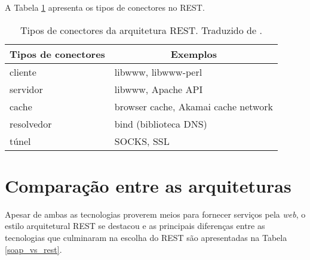     A Tabela \ref{rest-connectors-elements} apresenta os tipos de conectores no REST.
    
    \begin{table}[ht!]
    \centering
    \caption{Tipos de conectores da arquitetura REST. Traduzido de \cite{fielding2002}.}
    \label{rest-connectors-elements}
    \begin{tabular}{l|l}
    \hline
    \multicolumn{1}{c|}{\textbf{Tipos de conectores}} & \multicolumn{1}{c}{\textbf{Exemplos}} \\ \hline
    cliente                                            & libwww, libwww-perl                    \\ \hline
    servidor                                           & libwww, Apache API                     \\ \hline
    cache                                              & browser cache, Akamai cache network    \\ \hline
    resolvedor                                         & bind (biblioteca DNS)                  \\ \hline
    túnel                                              & SOCKS, SSL                             \\ \hline
    \end{tabular}
    \end{table}

\section{Comparação entre as arquiteturas}
      
    Apesar de ambas as tecnologias proverem meios para fornecer serviços pela \textit{web}, o estilo arquitetural REST se destacou
    e as principais diferenças entre as tecnologias que culminaram na escolha do REST são apresentadas na Tabela \ref{soap_vs_rest}.
    
